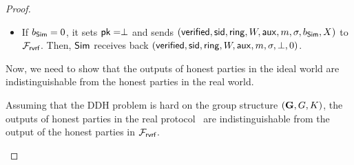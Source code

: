 \begin{proof}
\begin{itemize}
\begin{itemize}
\begin{itemize}
			\end{itemize}
			\item If $ b_{\mathsf{Sim}} = 0 $, it sets $ \mathsf{pk} = \perp $ and sends  $ (\mathsf{verified}, \textsf{sid}, \mathsf{ring}, W,\mathsf{aux}, m, \sigma, b_{\mathsf{Sim}}, X) $ to $ \mathcal{F}_{\textsf{rvrf}} $. Then, $ \mathsf{Sim} $ receives back $ (\mathsf{verified}, \textsf{sid}, \mathsf{ring}, W, \mathsf{aux},m, \sigma, \perp, 0) $. 
			
		\end{itemize}
		
		
		
		
		
		
	\end{itemize}

	Now, we need to show that the outputs of honest parties in the ideal world are indistinguishable from the honest parties in the real world. 
	
	\begin{lemma}\label{lem:honestoutput}
			Assuming that the DDH problem is hard on the group structure $ ({\mathbf{G}}, G,K) $, the outputs of honest parties in the real protocol \name\ are indistinguishable from the output of the honest parties in $ \mathcal{F}_{\textsf{rvrf}} $.
	\end{lemma}
		

\end{proof}
